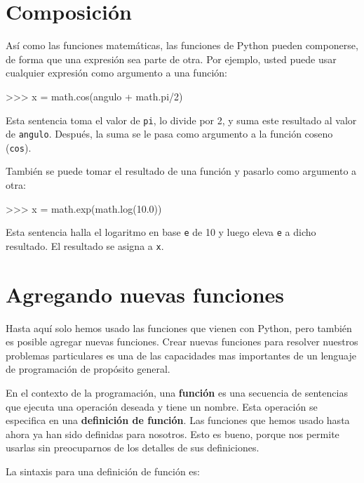 \section{Composición}

Así como las funciones matemáticas, las funciones de Python pueden
componerse, de forma que una expresión sea parte de otra. Por ejemplo, usted
puede usar cualquier expresión como argumento a una función:

\beforeverb
\begin{pyconcode}
>>> x = math.cos(angulo + math.pi/2)
\end{pyconcode}
\afterverb
%

Esta sentencia toma el valor de \texttt{pi}, lo divide por 2, y suma este
resultado al valor de  \texttt{angulo}.  Después, la suma se le pasa como 
argumento a la función coseno (\texttt{cos}).

También se puede tomar el resultado de una función y pasarlo como 
argumento a otra:

\beforeverb
\begin{pyconcode}
>>> x = math.exp(math.log(10.0))
\end{pyconcode}
\afterverb
%

Esta sentencia halla el logaritmo en base \texttt{e} de 10 y luego eleva 
\texttt{e} a dicho resultado. El resultado se asigna a  \texttt{x}.


\section{Agregando nuevas funciones}

Hasta aquí solo hemos usado las funciones que vienen con Python, pero también 
es posible agregar nuevas funciones. Crear nuevas funciones para resolver 
nuestros problemas particulares es una de las capacidades mas importantes de un 
lenguaje de programación de propósito general.

En el contexto de la programación, una {\bf función} es una secuencia de 
sentencias que ejecuta una operación deseada y tiene un nombre.  Esta operación 
se especifica en una {\bf definición de función}.  Las funciones que hemos 
usado hasta ahora ya han sido definidas para nosotros. Esto es bueno, porque 
nos permite usarlas sin preocuparnos de los detalles de sus definiciones.


La sintaxis para una definición de función es:

